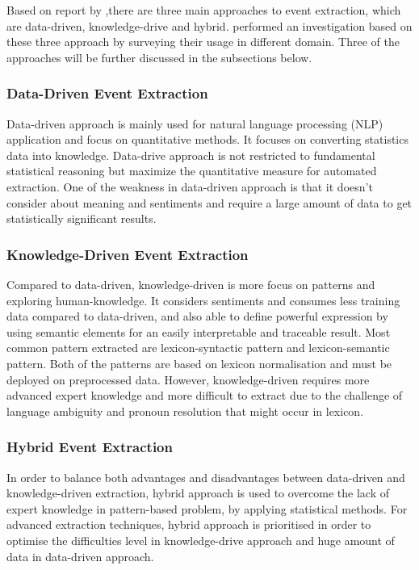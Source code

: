 \documentclass[twoside]{utmthesis}
\begin{document}
Based on report by \cite{hogenboom2011overview},there are three main approaches to event extraction, which are data-driven, knowledge-drive and hybrid. \cite{hogenboom2016survey} performed an investigation based on these three approach by surveying their usage in different domain. Three of the approaches will be further discussed in the subsections below. 

\subsubsection{Data-Driven Event Extraction}

Data-driven approach is mainly used for natural language processing (NLP) application and focus on quantitative methods. It focuses on converting statistics data into knowledge. Data-drive approach is not restricted to fundamental statistical reasoning but maximize the quantitative measure for automated extraction. One of the weakness in data-driven approach is that it doesn't consider about meaning and sentiments and require a large amount of data to get statistically significant results.

\subsubsection{Knowledge-Driven Event Extraction}

Compared to data-driven, knowledge-driven is more focus on patterns and exploring human-knowledge. It considers sentiments and consumes less training data compared to data-driven, and also able to define powerful expression by using semantic elements for an easily interpretable and traceable result. Most common pattern extracted are lexicon-syntactic pattern and lexicon-semantic pattern. Both of the patterns are based on lexicon normalisation and must be deployed on preprocessed data. However, knowledge-driven requires more advanced expert knowledge and more difficult to extract due to the challenge of language ambiguity and pronoun resolution that might occur in lexicon.  

\subsubsection{Hybrid Event Extraction}

In order to balance both advantages and disadvantages between data-driven and knowledge-driven extraction, hybrid approach is used to overcome the lack of expert knowledge in pattern-based problem, by applying statistical methods. For advanced extraction techniques, hybrid approach is prioritised in order to optimise the difficulties level in knowledge-drive approach and huge amount of data in data-driven approach. 
\end{document}
